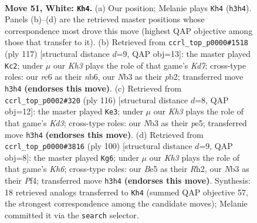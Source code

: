 \documentclass[11pt]{article}
\begin{document}
\clearpage

\begin{figure}[p]\centering
\begin{subfigure}{0.46\textwidth}\centering
\resizebox{\linewidth}{!}{%
\newchessgame
\chessboard[
  setfen={6k1/2P5/2r5/4B3/8/1N5K/8/8 w - - 15 51},
  showmover=false,
  pgfstyle=straightmove, color=movearrow, markmove={h3-h4}
]}
\caption{}
\end{subfigure}\hfill
\begin{subfigure}{0.46\textwidth}\centering
\resizebox{\linewidth}{!}{%
\newchessgame
\chessboard[
  setfen={8/8/1Nb5/6K1/p7/8/1P1k4/8 b - - 6 59},
  showmover=false,
  pgfstyle=straightmove, color=movearrow, markmove={d2-c2}
]}
\caption{}
\end{subfigure}
\\[4pt]
\begin{subfigure}{0.46\textwidth}\centering
\resizebox{\linewidth}{!}{%
\newchessgame
\chessboard[
  setfen={8/1B6/P7/2k1p3/r7/3K4/8/8 w - - 11 59},
  showmover=false,
  pgfstyle=straightmove, color=movearrow, markmove={d3-e3}
]}
\caption{}
\end{subfigure}\hfill
\begin{subfigure}{0.46\textwidth}\centering
\resizebox{\linewidth}{!}{%
\newchessgame
\chessboard[
  setfen={5k2/8/7K/8/5P2/3r3P/7R/8 w - - 13 51},
  showmover=false,
  pgfstyle=straightmove, color=movearrow, markmove={h6-g6}
]}
\caption{}
\end{subfigure}
\caption{\textbf{Move 51, White: \texttt{Kh4}.} (a) Our position; Melanie plays \texttt{Kh4} (\texttt{h3h4}). Panels (b)--(d) are the retrieved master positions whose correspondence most drove this move (highest QAP objective among those that transfer to it). (b) Retrieved from \texttt{ccrl\_top\_p0000\#1518} (ply 117) [structural distance $d$=9, QAP obj=13]: the master played \texttt{Kc2}; under $\mu$ our \emph{Kh3} plays the role of that game's \emph{Kd7}; cross-type roles: our \emph{r}c6 as their \emph{n}b6, our \emph{N}b3 as their \emph{p}b2; transferred move \texttt{h3h4} \textbf{(endorses this move)}. (c) Retrieved from \texttt{ccrl\_top\_p0002\#320} (ply 116) [structural distance $d$=8, QAP obj=12]: the master played \texttt{Ke3}; under $\mu$ our \emph{Kh3} plays the role of that game's \emph{Kd3}; cross-type roles: our \emph{N}b3 as their \emph{p}e5; transferred move \texttt{h3h4} \textbf{(endorses this move)}. (d) Retrieved from \texttt{ccrl\_top\_p0000\#3816} (ply 100) [structural distance $d$=9, QAP obj=8]: the master played \texttt{Kg6}; under $\mu$ our \emph{Kh3} plays the role of that game's \emph{Kh6}; cross-type roles: our \emph{B}e5 as their \emph{R}h2, our \emph{N}b3 as their \emph{P}f4; transferred move \texttt{h3h4} \textbf{(endorses this move)}. Synthesis: 18 retrieved analogs transferred to \texttt{Kh4} (summed QAP objective 57, the strongest correspondence among the candidate moves); Melanie committed it via the \texttt{search} selector.}
\label{fig:thought-m100}
\end{figure}
\end{document}
